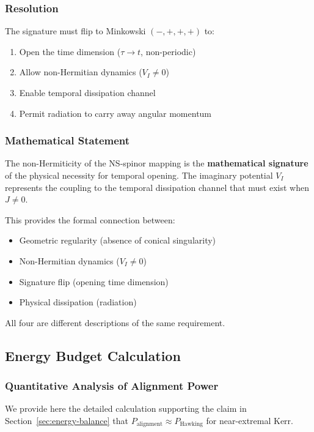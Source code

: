 \documentclass[11pt]{article}
\begin{document}
\subsubsection{Resolution}

The signature must flip to Minkowski $(-,+,+,+)$ to:
\begin{enumerate}
\item Open the time dimension ($\tau \to t$, non-periodic)
\item Allow non-Hermitian dynamics ($V_I \neq 0$)
\item Enable temporal dissipation channel
\item Permit radiation to carry away angular momentum
\end{enumerate}

\subsubsection{Mathematical Statement}

The non-Hermiticity of the NS-spinor mapping is the \textbf{mathematical signature} of the physical necessity for temporal opening. The imaginary potential $V_I$ represents the coupling to the temporal dissipation channel that must exist when $J \neq 0$.

This provides the formal connection between:
\begin{itemize}
\item Geometric regularity (absence of conical singularity)
\item Non-Hermitian dynamics ($V_I \neq 0$)
\item Signature flip (opening time dimension)
\item Physical dissipation (radiation)
\end{itemize}

All four are different descriptions of the same requirement.

\subsection{Energy Budget Calculation}\label{app:energy-budget}

\subsubsection{Quantitative Analysis of Alignment Power}

We provide here the detailed calculation supporting the claim in Section~\ref{sec:energy-balance} that $P_{\text{alignment}} \approx P_{\text{Hawking}}$ for near-extremal Kerr.
\end{document}
